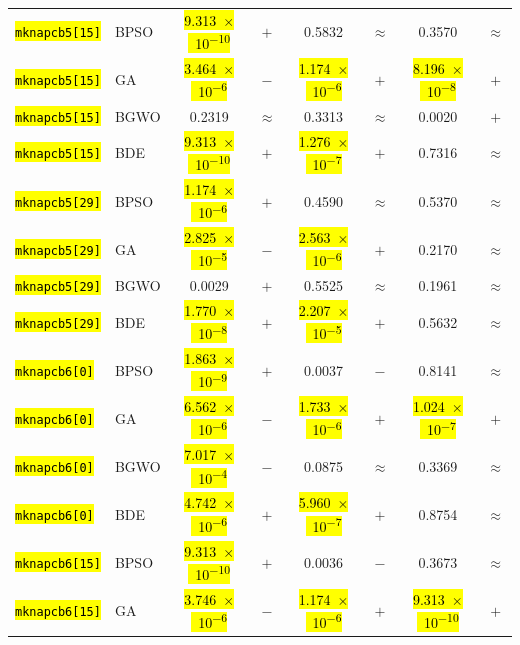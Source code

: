 \documentclass[mathematics,article,accept,moreauthors]{Definitions/mdpi}
\begin{document}
\begin{table}[H]
\begin{tabularx}{\textwidth}{Xlcccccc}
    \midrule
    \texttt{\hl{mknapcb5[15]}} & BPSO  & \hl{9.313~$\times$~10\textsuperscript{$-$10}} & $+$ &    0.5832 & $\approx$ &    0.3570 & $\approx$ \\
    \texttt{\hl{mknapcb5[15]}} & GA    & \hl{3.464~$\times$~10\textsuperscript{$-$6}} & $-$ & \hl{1.174~$\times$~10\textsuperscript{$-$6}} & $+$ & \hl{8.196~$\times$~10\textsuperscript{$-$8}} & $+$ \\
    \texttt{\hl{mknapcb5[15]}} & BGWO  &    0.2319 & $\approx$ &    0.3313 & $\approx$ &    0.0020 & $+$ \\
    \texttt{\hl{mknapcb5[15]}} & BDE   & \hl{9.313~$\times$~10\textsuperscript{$-$10}} & $+$ & \hl{1.276~$\times$~10\textsuperscript{$-$7}} & $+$ &    0.7316 & $\approx$ \\
    \midrule
    \texttt{\hl{mknapcb5[29]}} & BPSO  & \hl{1.174~$\times$~10\textsuperscript{$-$6}} & $+$ &    0.4590 & $\approx$ &    0.5370 & $\approx$ \\
    \texttt{\hl{mknapcb5[29]}} & GA    & \hl{2.825~$\times$~10\textsuperscript{$-$5}} & $-$ & \hl{2.563~$\times$~10\textsuperscript{$-$6}} & $+$ &    0.2170 & $\approx$ \\
    \texttt{\hl{mknapcb5[29]}} & BGWO  &    0.0029 & $+$ &    0.5525 & $\approx$ &    0.1961 & $\approx$ \\
    \texttt{\hl{mknapcb5[29]}} & BDE   & \hl{1.770~$\times$~10\textsuperscript{$-$8}} & $+$ & \hl{2.207~$\times$~10\textsuperscript{$-$5}} & $+$ &    0.5632 & $\approx$ \\
    \midrule
    \texttt{\hl{mknapcb6[0]}} & BPSO  & \hl{1.863~$\times$~10\textsuperscript{$-$9}} & $+$ &    0.0037 & $-$ &    0.8141 & $\approx$ \\
    \texttt{\hl{mknapcb6[0]}} & GA    & \hl{6.562~$\times$~10\textsuperscript{$-$6}} & $-$ & \hl{1.733~$\times$~10\textsuperscript{$-$6}} & $+$ & \hl{1.024~$\times$~10\textsuperscript{$-$7}} & $+$ \\
    \texttt{\hl{mknapcb6[0]}} & BGWO  & \hl{7.017~$\times$~10\textsuperscript{$-$4}} & $-$ &    0.0875 & $\approx$ &    0.3369 & $\approx$ \\
    \texttt{\hl{mknapcb6[0]}} & BDE   & \hl{4.742~$\times$~10\textsuperscript{$-$6}} & $+$ & \hl{5.960~$\times$~10\textsuperscript{$-$7}} & $+$ &    0.8754 & $\approx$ \\
    \midrule
    \texttt{\hl{mknapcb6[15]}} & BPSO  & \hl{9.313~$\times$~10\textsuperscript{$-$10}} & $+$ &    0.0036 & $-$ &    0.3673 & $\approx$ \\
    \texttt{\hl{mknapcb6[15]}} & GA    & \hl{3.746~$\times$~10\textsuperscript{$-$6}} & $-$ & \hl{1.174~$\times$~10\textsuperscript{$-$6}} & $+$ & \hl{9.313~$\times$~10\textsuperscript{$-$10}} & $+$ \\

\end{tabularx}
\end{table}
\end{document}
